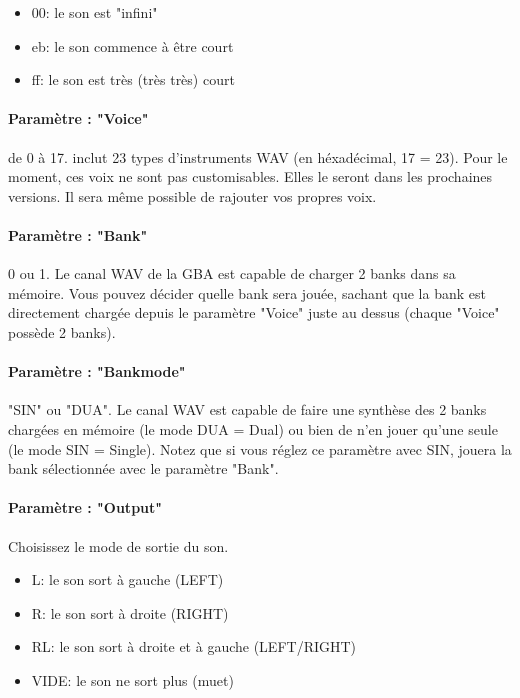 \documentclass[12pt,a4paper]{article}
\begin{document}
    \begin{itemize}
            \item{00: le son est "infini"}
            \item{eb: le son commence à être court}
            \item{ff: le son est très (très très) court}
        \end{itemize}

    \paragraph{Paramètre : "Voice"} de 0 à 17.
    \FAT inclut 23 types d'instruments WAV (en héxadécimal, 17 = 23).
    Pour le moment, ces voix ne sont pas customisables.
    Elles le seront dans les prochaines versions.
    Il sera même possible de rajouter vos propres voix.

    \paragraph{Paramètre : "Bank"} 0 ou 1.
    Le canal WAV de la GBA est capable de charger 2 banks dans sa mémoire.
    Vous pouvez décider quelle bank sera jouée,
    sachant que la bank est directement chargée depuis le paramètre "Voice" juste au dessus (chaque "Voice" possède 2 banks).

    \paragraph{Paramètre : "Bankmode"} "SIN" ou "DUA".
    Le canal WAV est capable de faire une synthèse des 2 banks chargées en mémoire (le mode DUA = Dual) ou bien de n'en jouer qu'une seule (le mode SIN = Single).
    Notez que si vous réglez ce paramètre avec SIN, \FAT jouera la bank sélectionnée avec le paramètre "Bank".

    \paragraph{Paramètre : "Output"} Choisissez le mode de sortie du son.
    \medskip

    \begin{itemize}
        \item{L: le son sort à gauche (LEFT)}
        \item{R: le son sort à droite (RIGHT)}
        \item{RL: le son sort à droite et à gauche (LEFT/RIGHT)}
        \item{VIDE: le son ne sort plus (muet)}
    \end{itemize}
\end{document}
